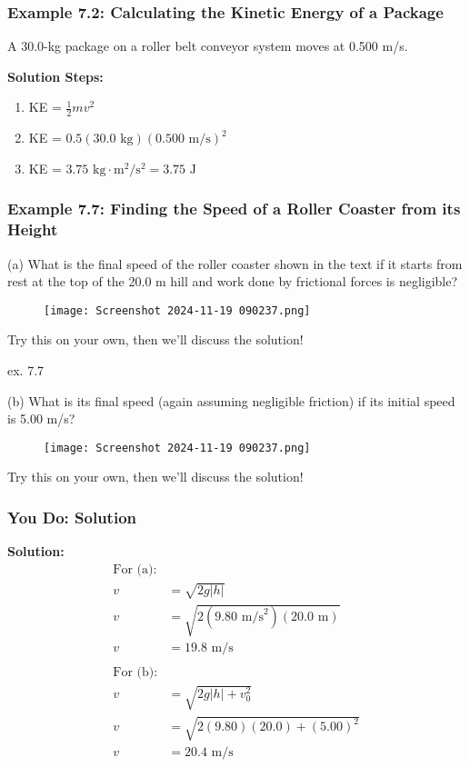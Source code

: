 \documentclass{beamer}
\begin{document}
\begin{frame}
\frametitle{Example 7.2: Calculating the Kinetic Energy of a Package}
A 30.0-kg package on a roller belt conveyor system moves at 0.500 m/s.
\vspace{0.5cm}
\end{frame}

\begin{frame}
\textbf{Solution Steps:}
\begin{enumerate}
    \item KE = $\frac{1}{2}mv^2$ 
    \item KE = $0.5(30.0\text{ kg})(0.500\text{ m/s})^2$
    \item KE = $3.75\text{ kg}\cdot\text{m}^2/\text{s}^2 = 3.75\text{ J}$
\end{enumerate}
\end{frame}

\begin{frame}
\frametitle{Example 7.7: Finding the Speed of a Roller Coaster from its Height}
(a) What is the final speed of the roller coaster shown in the text if it starts from rest at the top of the 20.0 m hill and work done by frictional forces is negligible?

\begin{figure}[H]
    \centering
    \texttt{[image: Screenshot 2024-11-19 090237.png]}
\end{figure}
Try this on your own, then we'll discuss the solution!
\end{frame}

\begin{frame}{ex. 7.7}
    

(b) What is its final speed (again assuming negligible friction) if its initial speed is 5.00 m/s?

\begin{figure}[H]
    \centering
    \texttt{[image: Screenshot 2024-11-19 090237.png]}
\end{figure}
Try this on your own, then we'll discuss the solution!
\end{frame}

\begin{frame}
\frametitle{You Do: Solution}
\textbf{Solution:}
\begin{align*}
\text{For (a):} \\
v &= \sqrt{2g|h|} \\
v &= \sqrt{2(9.80\text{ m/s}^2)(20.0\text{ m})} \\
v &= 19.8\text{ m/s} \\
\\
\text{For (b):} \\
v &= \sqrt{2g|h| + v_0^2} \\
v &= \sqrt{2(9.80)(20.0) + (5.00)^2} \\
v &= 20.4\text{ m/s}
\end{align*}
\end{frame}
\end{document}
